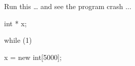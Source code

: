 Run this \ldots{} and see the program crash ...



\begin{consolethree}[escapeinside=||]

int * x;

while (1)

{

    x = new int[5000];

}

\end{consolethree}

